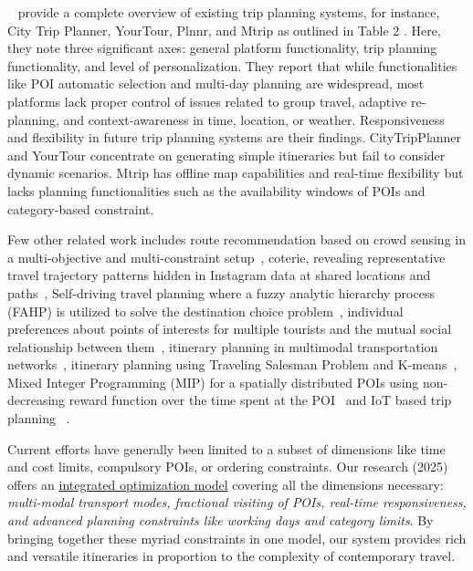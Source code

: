 ~\cite{sylejmani2011survey} provide a complete overview of existing trip planning systems, for instance, City Trip Planner, YourTour, Plnnr, and Mtrip as outlined in Table 2 . Here, they note three significant axes: general platform functionality, trip planning functionality, and level of personalization. They report that while functionalities like POI automatic selection and multi-day planning are widespread, most platforms lack proper control of issues related to group travel, adaptive re-planning, and context-awareness in time, location, or weather. Responsiveness and flexibility in future trip planning systems are their findings. CityTripPlanner and YourTour concentrate on generating simple itineraries but fail to consider dynamic scenarios. Mtrip has offline map capabilities and real-time flexibility but lacks planning functionalities such as the availability windows of POIs and category-based constraint.

Few other related work includes route recommendation based on crowd sensing in a multi-objective and multi-constraint setup~\cite{zheng2021novel}, coterie, revealing representative travel trajectory patterns hidden in Instagram data at shared locations and paths~\cite{yu2017mining}, Self-driving travel planning where a fuzzy analytic hierarchy process (FAHP) is utilized to solve the destination choice problem~\cite{jiaoman2018travel}, individual preferences about points of interests for multiple tourists and the mutual social relationship between them~\cite{sylejmani2017planning}, itinerary planning in multimodal transportation networks~\cite{zografos2008algorithms}, itinerary planning using Traveling Salesman Problem and K-means~\cite{rani2018development}, Mixed Integer Programming (MIP) for a spatially distributed POIs using non-decreasing reward function over the time spent at the POI~\cite{yu2014optimal} and IoT based trip planning ~\cite{arora2024itinerary}.   

Current efforts have generally been limited to a subset of dimensions like time and cost limits, compulsory POIs, or ordering constraints. Our research (2025) offers an \underline{integrated optimization model} covering all the dimensions necessary: \emph{multi-modal transport modes, fractional visiting of POIs, real-time responsiveness, and advanced planning constraints like working days and category limits}. By bringing together these myriad constraints in one model, our system provides rich and versatile itineraries in proportion to the complexity of contemporary travel.

